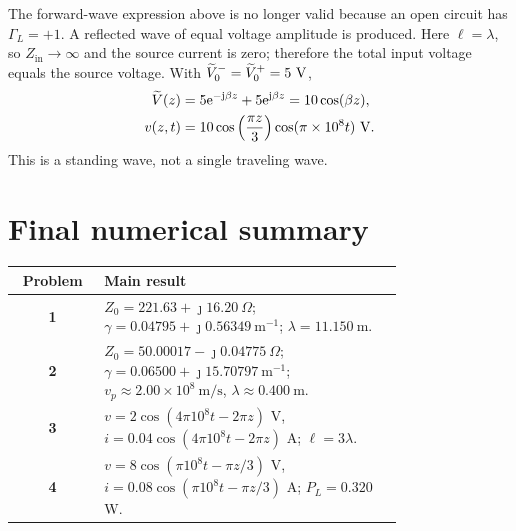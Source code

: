\documentclass[12pt,a4paper]{article}
\begin{document}
The forward-wave expression above is no longer valid because an open circuit
has $\Gamma_L=+1$.  A reflected wave of equal voltage amplitude is produced.
Here $\ell=\lambda$, so $Z_{\mathrm{in}}\to\infty$ and the source current is
zero; therefore the total input voltage equals the source voltage.  With
$\widetilde{V}_0^-=\widetilde{V}_0^+=5~\mathrm{V}$,
\begin{align}
\widetilde{V}(z)&=5\mathrm{e}^{-\mathrm{j}\beta z}+5\mathrm{e}^{\mathrm{j}\beta z}
=10\cos(\beta z),\\
v(z,t)&=10\cos\left(\frac{\pi z}{3}\right)
\cos(\pi\times10^8t)~\mathrm{V}.
\end{align}
This is a standing wave, not a single traveling wave.


\section*{Final numerical summary}
\begin{center}
\renewcommand{\arraystretch}{1.25}
\begin{tabular}{>{\bfseries}c p{0.77\linewidth}}
\toprule
Problem & Main result \\
\midrule
1 & $Z_0=221.63+\jmath16.20~\Omega$;
$\gamma=0.04795+\jmath0.56349~\mathrm{m}^{-1}$;
$\lambda=11.150~\mathrm{m}$. \\
2 & $Z_0=50.00017-\jmath0.04775~\Omega$;
$\gamma=0.06500+\jmath15.70797~\mathrm{m}^{-1}$;
$v_p\approx2.00\times10^8~\mathrm{m/s}$, $\lambda\approx0.400~\mathrm{m}$. \\
3 & $v=2\cos(4\pi10^8t-2\pi z)$ V,
$i=0.04\cos(4\pi10^8t-2\pi z)$ A; $\ell=3\lambda$. \\
4 & $v=8\cos(\pi10^8t-\pi z/3)$ V,
$i=0.08\cos(\pi10^8t-\pi z/3)$ A; $P_L=0.320$ W. \\
\bottomrule
\end{tabular}
\end{center}
\end{document}

